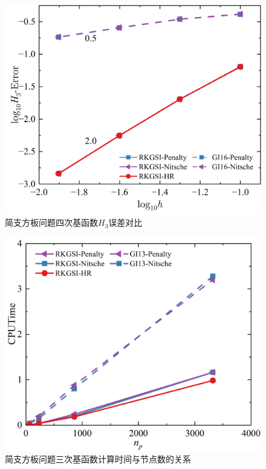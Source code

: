 \begin{figure}[H]
    \centering
    \includegraphics[scale=0.5]{figure/PHR/R/QH3.png}
    \caption{简支方板问题四次基函数$H_3$误差对比}\label{RQLH}
\end{figure}
\begin{figure}[H]
    \centering
    \includegraphics[scale=0.5]{figure/PHR/R/Ccputime.png}
    \caption{简支方板问题三次基函数计算时间与节点数的关系}\label{RCcputime}
\end{figure}
\newpage
